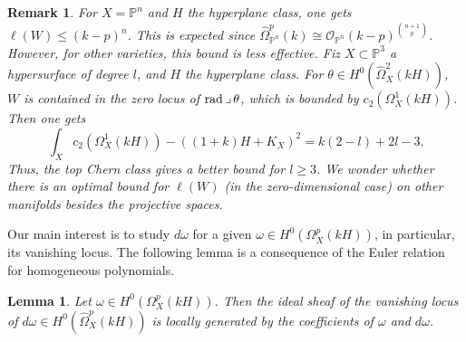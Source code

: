 \documentclass[a4paper, 11pt]{amsart}
\theoremstyle{plain}
\numberwithin{theorem}{section}
\newtheorem{lemma}[theorem]{Lemma}
\newtheorem{remark}[theorem]{Remark}
\theoremstyle{definition}
\DeclareMathOperator{\cont}{\lrcorner}
\newcommand{\p}[1]{{\mathbb{P}^{#1}}}
\newcommand{\opn}{{\mathcal O}_{\mathbb{P}^{n}}}
\newcommand{\pn}{{\mathbb{P}^{n}}}
\newcommand{\rad}{ {\rm rad}}
\begin{document}
\begin{remark}
For $X = \pn$ and $H$ the hyperplane class, one gets $\ell(W) \leq (k-p)^n$. This is expected since $\widehat{\Omega}_{\pn}^p(k) \cong \opn(k-p)^{\binom{n+1}{p}}$. However, for other varieties, this bound is less effective. Fiz $X \subset \p3$ a hypersurface of degree $l$, and $H$ the hyperplane class. For $\theta \in H^0(\widehat{\Omega}_X^2(kH))$, $W$ is contained in the zero locus of $\rad \cont \theta$, which is bounded by $c_2(\Omega^{1}_X(kH))$. Then one gets
\[
\int_X c_2(\Omega^{1}_X(kH)) - ((1+k)H+K_X)^2 = k(2-l) + 2l-3. 
\]
Thus, the top Chern class gives a better bound for $l\geq 3$. We wonder whether there is an optimal bound for $\ell(W)$ (in the zero-dimensional case) on other manifolds besides the projective spaces.   
\end{remark}

Our main interest is to study $d\omega$ for a given $\omega \in H^0(\Omega_X^p(kH))$, in particular, its vanishing locus. The following lemma is a consequence of the Euler relation for homogeneous polynomials.


\begin{lemma}
Let $\omega \in H^0(\Omega_X^p(kH))$. Then the ideal sheaf of the vanishing locus of $d\omega \in H^0(\widehat{\Omega}_X^p(kH))$ is locally generated by the coefficients of $\omega$ and $d\omega$. 
\end{lemma}
\end{document}
